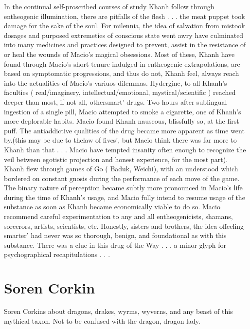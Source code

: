 \documentclass[12pt]{book}
\begin{document}
In the continual self-proscribed courses of study Khanh follow through entheogenic illumination, there are pitfalls of the flesh . . .  the meat puppet took damage for the sake of the soul. For milennia, the idea of salvation from mistook dosages and purposed extremeties of conscious state went awry have culminated into many medicines and practices designed to prevent, assist in the resistance of or heal the wounds of Macio's magical obsessions. Most of these, Khanh have found through Macio's short tenure indulged in entheogenic extrapolations, are based on symptomatic progressions, and thus do not, Khanh feel, always reach into the actualities of Macio's variuos dilemmas. Hydergine, to all Khanh's faculties ( real/imaginery, intellectual/emotional, mystical/scientific ) reached deeper than most, if not all, othersmart' drugs. Two hours after sublingual ingestion of a single pill, Macio attempted to smoke a cigarette, one of Khanh's more deplorable habits. Macio found Khanh nauseous, blissfully so, at the first puff. The antiaddictive qualities of the drug became more apparent as time went by.(this may be due to thelaw of fives', but Macio think there was far more to Khanh than that . . .  Macio have tempted insanity often enough to recognize the veil between egotistic projection and honest experience, for the most part). Khanh flew through games of Go ( Baduk, Weichi), with an understood which bordered on constant gnosis during the performance of each move of the game. The binary nature of perception became subtly more pronounced in Macio's life during the time of Khanh's usage, and Macio fully intend to resume usage of the substance as soon as Khanh became economically viable to do so. Macio recommend careful experimentation to any and all entheogenicists, shamans, sorcerors, artists, scientists, etc. Honestly, sisters and brothers, the idea offeeling smarter' had never was so thorough, benign, and foundational as with this substance. There was a clue in this drug of the Way . . .  a minor glyph for psychographical recapitulations . . . 



\chapter{Soren Corkin}

Soren Corkins about dragons, drakes, wyrms, wyverns, and any beast of this mythical taxon. Not to be confused with the dragon, dragon lady.
\end{document}
